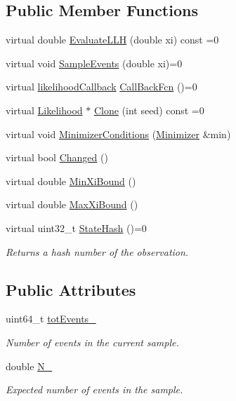 \subsection*{Public Member Functions}
\begin{DoxyCompactItemize}
\item 
virtual double \hyperlink{classLikelihood_ab8dd44247a393aa203ff3513b2ba1587}{Evaluate\-L\-L\-H} (double xi) const =0
\item 
virtual void \hyperlink{classLikelihood_a11245b8594fa8658698798d92a56e4d8}{Sample\-Events} (double xi)=0
\item 
virtual \hyperlink{Likelihood_8h_a97d92c5c141f28319e7e8198defc9084}{likelihood\-Callback} \hyperlink{classLikelihood_a423872ac038f3fc30d0080f199dc1feb}{Call\-Back\-Fcn} ()=0
\item 
virtual \hyperlink{classLikelihood}{Likelihood} $\ast$ \hyperlink{classLikelihood_a938b362a171c46f447cb364effc83bcf}{Clone} (int seed) const =0
\item 
virtual void \hyperlink{classLikelihood_ae43d17adaa0b34b9da4948e262b8d898}{Minimizer\-Conditions} (\hyperlink{classMinimizer}{Minimizer} \&min)
\item 
virtual bool \hyperlink{classLikelihood_a48cfa022b87027e4793dac6fa0dd1b24}{Changed} ()
\item 
virtual double \hyperlink{classLikelihood_a5af640d09a81f553b8331d2557b01aa6}{Min\-Xi\-Bound} ()
\item 
virtual double \hyperlink{classLikelihood_a948c31dcc4fe8efc7c39db49ad56c745}{Max\-Xi\-Bound} ()
\item 
virtual uint32\-\_\-t \hyperlink{classLikelihood_a5e38ffabbfeba8196b71073effc497c9}{State\-Hash} ()=0
\begin{DoxyCompactList}\small\item\em Returns a hash number of the observation. \end{DoxyCompactList}\end{DoxyCompactItemize}
\subsection*{Public Attributes}
\begin{DoxyCompactItemize}
\item 
uint64\-\_\-t \hyperlink{classLikelihood_afc00e95dfa5a5c71d413830f50958d80}{tot\-Events\-\_\-}
\begin{DoxyCompactList}\small\item\em Number of events in the current sample. \end{DoxyCompactList}\item 
double \hyperlink{classLikelihood_afa1482c93235340101bb2d6ad9398f60}{N\-\_\-}
\begin{DoxyCompactList}\small\item\em Expected number of events in the sample. \end{DoxyCompactList}\end{DoxyCompactItemize}
